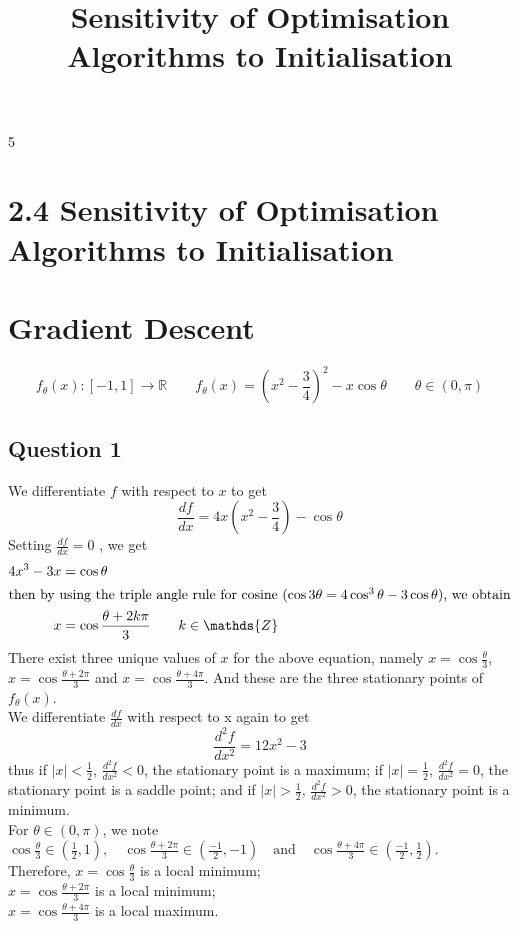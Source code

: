 \documentclass[10pt]{article}
\title{\flushleft2.4 Sensitivity of Optimisation Algorithms to Initialisation\\ }
\date{}
\begin{document}
5\hfill{}
\section*{\LARGE{2.4 Sensitivity of Optimisation Algorithms to Initialisation}}
\section*{Gradient Descent}
  \[f_{\theta}(x):[-1,1]\rightarrow\mathds{R}\qquad f_{\theta}(x)=(x^2-\frac{3}{4})^2-x\cos{\theta}\qquad \theta\in(0,\pi)\]
\subsection*{Question 1}
We differentiate $f$ with respect to $x$ to get
\[\frac{df}{dx}=4x(x^2-\frac{3}{4})-\cos{\theta}\]
Setting \(\frac{df}{dx}=0\) , we get
\begin{align*}
4x^3-3x &= \cos{\theta}\\
\intertext{then by using the triple angle rule for cosine ($\cos{3\theta}=4\cos^3{\theta}-3\cos{\theta}$), we obtain}
x &= \cos{\frac{\theta+2k\pi}{3}}\qquad k\in\mathds{Z}
\end{align*}
There exist three unique values of $x$ for the above equation, namely $x=\cos{\frac{\theta}{3}}$, $x=\cos{\frac{\theta+2\pi}{3}}$ and $x=\cos{\frac{\theta+4\pi}{3}}$. And these are the three stationary points of $f_{\theta}(x)$.\\
We differentiate $\frac{df}{dx}$ with respect to x again to get
\[\frac{d^2f}{dx^2}=12x^2-3\]
thus if $|x|<\frac{1}{2}$, $\frac{d^2f}{dx^2}<0$, the stationary point is a maximum; if $|x|=\frac{1}{2}$, $\frac{d^2f}{dx^2}=0$, the stationary point is a saddle point; and if $|x|>\frac{1}{2}$, $\frac{d^2f}{dx^2}>0$, the stationary point is a minimum.\\
For $\theta\in(0,\pi)$, we note $\cos{\frac{\theta}{3}}\in(\frac{1}{2},1),\quad\cos{\frac{\theta+2\pi}{3}}\in(\frac{-1}{2},-1)\quad\text{and}\quad\cos{\frac{\theta+4\pi}{3}}\in(\frac{-1}{2},\frac{1}{2})$.\\
Therefore, $x=\cos{\frac{\theta}{3}}$ is a local minimum;\\
$x=\cos{\frac{\theta+2\pi}{3}}$ is a local minimum;\\
$x=\cos{\frac{\theta+4\pi}{3}}$ is a local maximum.
\end{document}
